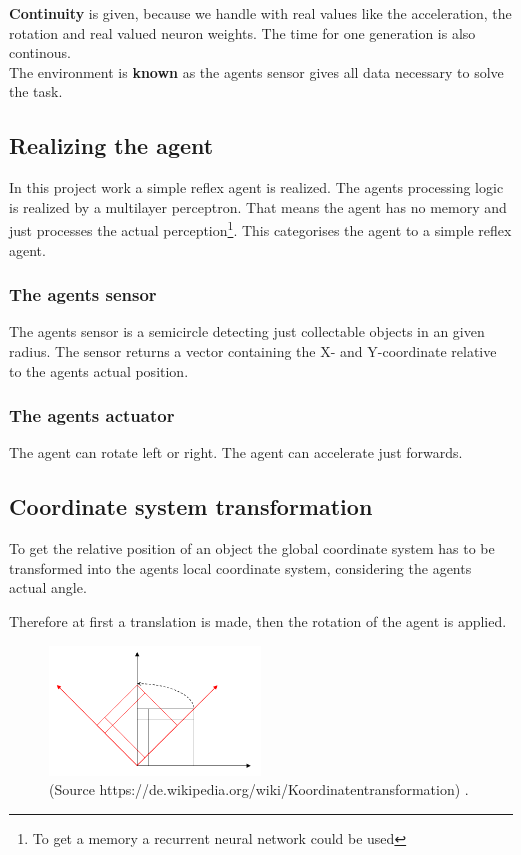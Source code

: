 \documentclass[10pt,a4paper,DIV=11]{scrreprt}
\begin{document}
\textbf{Continuity} is given, because we handle with real values like the acceleration, the rotation and real valued neuron weights. The time for one generation is also continous. \\

The environment is \textbf{known} as the agents sensor gives all data necessary to solve the task.\\

\subsection{Realizing the agent}
In this project work a simple reflex agent is realized.
The agents processing logic is realized by a multilayer perceptron. That means the agent has no memory and just processes the actual perception\footnote{To get a memory a recurrent neural network could be used}. This categorises the agent to a simple reflex agent.

\subsubsection*{The agents sensor}
The agents sensor is a semicircle detecting just collectable objects in an given radius. The sensor returns a vector containing the X- and Y-coordinate relative to the agents actual position.

\subsubsection*{The agents actuator}
The agent can rotate left or right.
The agent can accelerate just forwards.


\subsection{Coordinate system transformation}

To get the relative position of an object the global coordinate system has to be transformed into the agents local coordinate system, considering the agents actual angle.

Therefore at first a translation is made, then the rotation of the agent is applied.

\begin{center}
	\begin{figure}[H]
		\centering
		\includegraphics[width=0.5\textwidth,scale=1.0]{files/CoordinateRotation.png}  
		\caption{(Source https://de.wikipedia.org/wiki/Koordinatentransformation) \cite{wikipedia}.}
		\label{fig:cosys-transform}
	\end{figure}
\end{center}
\end{document}
